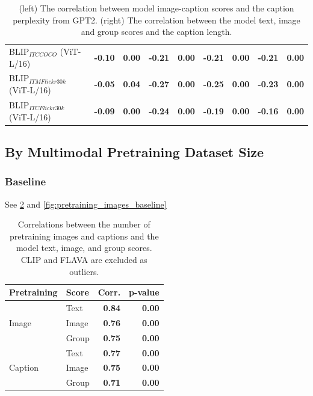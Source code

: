 \begin{table}[ht]
\begin{adjustbox}{max width=\textwidth}
\begin{tabular}{l|rr|rrrrrr}
 BLIP$_{ITC COCO}$ (ViT-L/16)        & \textbf{-0.10} & \textbf{0.00} & \textbf{-0.21} & \textbf{0.00} & \textbf{-0.21} & \textbf{0.00} & \textbf{-0.21} & \textbf{0.00} \\
 BLIP$_{ITM Flickr30k}$ (ViT-L/16)   & \textbf{-0.05} & \textbf{0.04} & \textbf{-0.27} & \textbf{0.00} & \textbf{-0.25} & \textbf{0.00} & \textbf{-0.23} & \textbf{0.00} \\
 BLIP$_{ITC Flickr30k}$ (ViT-L/16)   & \textbf{-0.09} & \textbf{0.00} & \textbf{-0.24} & \textbf{0.00} & \textbf{-0.19} & \textbf{0.00} & \textbf{-0.16} & \textbf{0.00} \\
\bottomrule
\end{tabular}
\end{adjustbox}
\caption{(left) The correlation between model image-caption scores and the caption perplexity from GPT2. (right) The correlation between the model text, image and group scores and the caption length.}
\label{tab:perplexity-and-length-correlations-ours}
\end{table}

\subsection{By Multimodal Pretraining Dataset Size}

\subsubsection{Baseline}

See \cref{tab:data-size-correlations-baseline} and \cref{fig:pretraining_images_baseline}

\begin{table}[ht]
\centering
\begin{tabular}{llrr}
\toprule
Pretraining & Score & Corr. & p-value\\\midrule
 & Text & \textbf{0.84} & \textbf{0.00} \\
 Image & Image & \textbf{0.76} & \textbf{0.00} \\
 & Group & \textbf{0.75} & \textbf{0.00} \\\midrule
 & Text  & \textbf{0.77} & \textbf{0.00} \\
 Caption & Image & \textbf{0.75} & \textbf{0.00} \\
 & Group & \textbf{0.71} & \textbf{0.00} \\
\bottomrule
\end{tabular}
\caption{Correlations between the number of pretraining images and captions and the model text, image, and group scores. CLIP and FLAVA are excluded as outliers.}
\label{tab:data-size-correlations-baseline}
\end{table}

